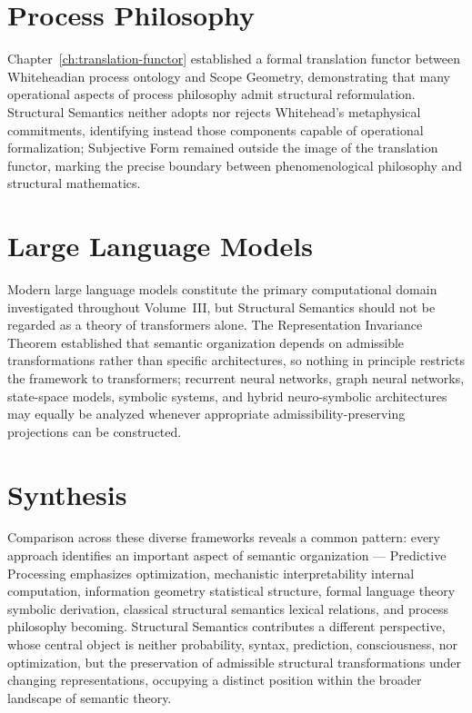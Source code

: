 \documentclass[11pt,twoside,openright]{book}
\numberwithin{equation}{chapter}
\theoremstyle{definition}
\theoremstyle{plain}
\theoremstyle{remark}
\theoremstyle{definition}
\begin{document}
\section{Process Philosophy}

Chapter~\ref{ch:translation-functor} established a formal translation
functor between Whiteheadian process ontology and Scope Geometry,
demonstrating that many operational aspects of process philosophy admit
structural reformulation. Structural Semantics neither adopts nor rejects
Whitehead's metaphysical commitments, identifying instead those
components capable of operational formalization; Subjective Form
remained outside the image of the translation functor, marking the
precise boundary between phenomenological philosophy and structural
mathematics.

\section{Large Language Models}

Modern large language models constitute the primary computational domain
investigated throughout Volume~III, but Structural Semantics should not
be regarded as a theory of transformers alone. The Representation
Invariance Theorem established that semantic organization depends on
admissible transformations rather than specific architectures, so nothing
in principle restricts the framework to transformers; recurrent neural
networks, graph neural networks, state-space models, symbolic systems,
and hybrid neuro-symbolic architectures may equally be analyzed whenever
appropriate admissibility-preserving projections can be constructed.

\section{Synthesis}

Comparison across these diverse frameworks reveals a common pattern:
every approach identifies an important aspect of semantic
organization --- Predictive Processing emphasizes optimization,
mechanistic interpretability internal computation, information geometry
statistical structure, formal language theory symbolic derivation,
classical structural semantics lexical relations, and process philosophy
becoming. Structural Semantics contributes a different perspective, whose
central object is neither probability, syntax, prediction, consciousness,
nor optimization, but the preservation of admissible structural
transformations under changing representations, occupying a distinct
position within the broader landscape of semantic theory.
\end{document}
